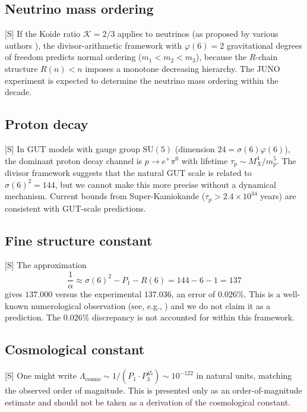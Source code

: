 \documentclass[11pt,letterpaper]{article}
\theoremstyle{definition}
\theoremstyle{remark}
\newcommand{\speculative}{\textsf{[S]}}
\begin{document}
\subsection{Neutrino mass ordering}

\speculative{} If the Koide ratio $\mathcal{K} = 2/3$ applies to neutrinos 
(as proposed by various authors \cite{Koide1983,Brannen2006}), 
the divisor-arithmetic framework with $\varphi(6) = 2$ gravitational 
degrees of freedom predicts normal ordering ($m_1 < m_2 < m_3$), 
because the $R$-chain structure $R(n) < n$ imposes a monotone decreasing 
hierarchy. The JUNO experiment \cite{JUNO2022} is expected to determine 
the neutrino mass ordering within the decade.

\subsection{Proton decay}

\speculative{} In GUT models with gauge group $\mathrm{SU}(5)$ 
(dimension $24 = \sigma(6)\varphi(6)$), the dominant proton decay channel 
is $p \to e^+ \pi^0$ with lifetime $\tau_p \sim M_X^4 / m_p^5$.
The divisor framework suggests that the natural GUT scale is related to 
$\sigma(6)^2 = 144$, but we cannot make this more precise without 
a dynamical mechanism. Current bounds from Super-Kamiokande 
\cite{SuperK2020} ($\tau_p > 2.4 \times 10^{34}$ years) 
are consistent with GUT-scale predictions.

\subsection{Fine structure constant}

\speculative{} The approximation 
\begin{equation}
\frac{1}{\alpha} \approx \sigma(6)^2 - P_1 - R(6) = 144 - 6 - 1 = 137
\end{equation}
gives $137.000$ versus the experimental $137.036$, an error of $0.026\%$.  
This is a well-known numerological observation (see, e.g., \cite{Eddington1936}) 
and we do not claim it as a prediction. The $0.026\%$ discrepancy is 
not accounted for within this framework.

\subsection{Cosmological constant}

\speculative{} One might write 
$\Lambda_{\text{cosmo}} \sim 1/(P_1 \cdot P_3^{45}) \sim 10^{-122}$ 
in natural units, matching the observed order of magnitude.
This is presented only as an order-of-magnitude estimate and 
should not be taken as a derivation of the cosmological constant.
\end{document}
